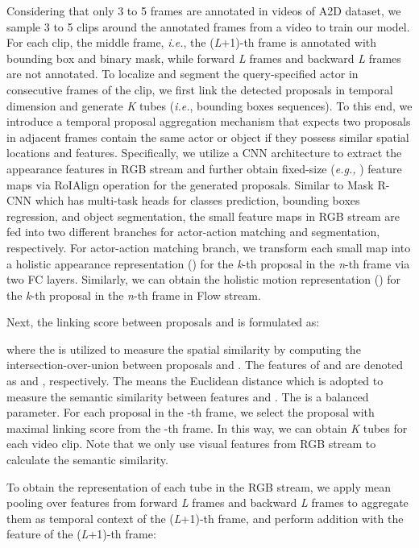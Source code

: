 \documentclass[journal]{IEEEtran}
\begin{document}
Considering that only 3 to 5 frames are annotated in videos of A2D dataset, we sample 3 to 5 clips around the annotated frames from a video to train our model. For each clip, the middle frame, \emph{i.e.}, the (\emph{L}+1)-th frame is annotated with bounding box and binary mask, while forward \emph{L} frames and backward \emph{L} frames are not annotated. To localize and segment the query-specified actor in consecutive frames of the clip, we first link the detected proposals  in temporal dimension and generate \emph{K} tubes (\emph{i.e.}, bounding boxes sequences). To this end, we introduce a temporal proposal aggregation mechanism that expects two proposals in adjacent frames contain the same actor or object if they possess similar spatial locations and features. Specifically, we utilize a CNN architecture to extract the appearance features in RGB stream and further obtain fixed-size (\emph{e.g., }) feature maps via RoIAlign operation \cite{he2017mask} for the generated proposals. Similar to Mask R-CNN \cite{he2017mask} which has multi-task heads for classes prediction, bounding boxes regression, and object segmentation, the small feature maps in RGB stream are fed into two different branches for actor-action matching and segmentation, respectively. For actor-action matching branch, we transform each small map into a holistic appearance representation   () for the \emph{k}-th proposal in the \emph{n}-th frame via two FC layers. Similarly, we can obtain the holistic motion representation   () for the \emph{k}-th proposal in the \emph{n}-th frame in Flow stream.

Next, the linking score between proposals  and  is formulated as:

where the  is utilized to measure the spatial similarity by computing the intersection-over-union between proposals  and . The features of  and  are denoted as  and , respectively. The  means the Euclidean distance which is adopted to measure the semantic similarity between features  and . The  is a balanced parameter. For each proposal in the -th frame, we select the proposal with maximal linking score from the -th frame. In this way, we can obtain \emph{K} tubes for each video clip. Note that we only use visual features from RGB stream to calculate the semantic similarity.


To obtain the representation of each tube in the RGB stream, we apply mean pooling over features from forward \emph{L} frames and backward \emph{L} frames to aggregate them as temporal context of the (\emph{L}+1)-th frame, and perform addition with the feature of the (\emph{L}+1)-th frame:
\end{document}
